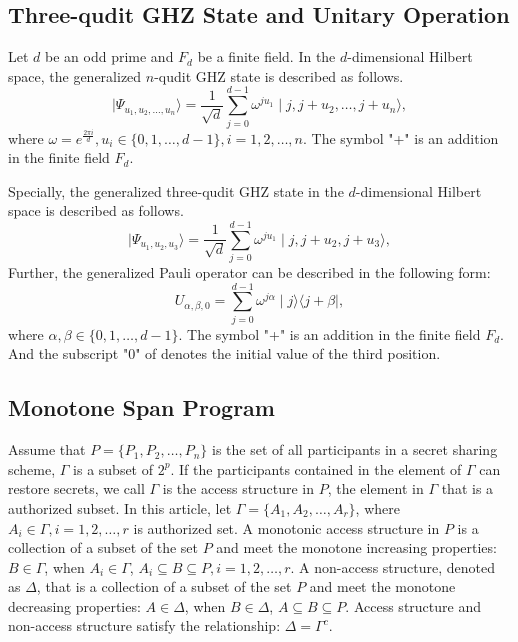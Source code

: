 \documentclass[pdflatex,sn-mathphys]{sn-jnl}%
\theoremstyle{thmstyleone}%
\theoremstyle{thmstyletwo}%
\theoremstyle{thmstylethree}%
\begin{document}
\subsection{Three-qudit GHZ State and Unitary Operation}\label{subsec2}

Let $d$ be an odd prime and $F_d$ be a finite field. In the $d$-dimensional Hilbert space, the generalized $n$-qudit GHZ state is described as follows.
\begin{equation}
\mid\varPsi_{{u_1},{u_2},\dots,{u_n}}\rangle=\frac{1}{\sqrt{d}}\sum_{j=0}^{d-1} \omega^{j{u_1}}\mid{j,j+{u_2,\dots,j+u_n}}\rangle,\label{eq1}
\end{equation}
where $\omega=e^\frac{2\pi i}{d},u_i\in\lbrace0,1,\dots,d-1\rbrace, i=1,2,\dots,n$. The symbol "+" is an addition in the finite field $F_d$.

Specially, the generalized three-qudit GHZ state in the $d$-dimensional Hilbert space is described as follows.
\begin{equation}
\mid\varPsi_{{u_1},{u_2},{u_3}}\rangle=\frac{1}{\sqrt{d}}\sum_{j=0}^{d-1} \omega^{j{u_1}}\mid{j,j+{u_2,j+u_3}}\rangle,\label{eq2}
\end{equation}
Further, the generalized Pauli operator can be described in the following form:
\begin{equation}
U_{{\alpha},{\beta},{0}}=\sum_{j=0}^{d-1} \omega^{j{\alpha}}\mid{j}\rangle\langle{j+\beta}\mid,\label{eq3}
\end{equation}
where $\alpha,\beta\in\lbrace0,1,\dots,d-1\rbrace$. The symbol "+" is an addition in the finite field $F_d$. And the subscript "0" of denotes the initial value of the third position.

\subsection{Monotone Span Program}\label{subsec2}

Assume that $P=\lbrace{{P_1},{P_2},\dots,{P_n}}\rbrace$ is the set of all participants in a secret sharing scheme, $\varGamma$ is a subset of $2^p$.  If the participants contained in the element of $\varGamma$ can restore secrets, we call $\varGamma$ is the access structure in $P$,  the element in $\varGamma $ that is a authorized subset. In this article, let $\varGamma=\lbrace{A_1,A_2,\dots,A_r}\rbrace$, where $A_i\in \varGamma,i=1,2,\dots,r$ is authorized set.
A monotonic access structure in $P$ is a collection of a subset of the set $P$ and meet the monotone increasing properties: $B\in\varGamma$, when $A_i\in \varGamma $, $A_i\subseteq B\subseteq P, i=1,2,\dots,r $. A non-access structure, denoted as $\Delta $, that is a collection of a subset of the set $P$ and meet the monotone decreasing properties: $A\in\Delta$, when $B\in \Delta $, $A\subseteq B\subseteq P $. Access structure and non-access structure satisfy the relationship: $\Delta=\varGamma^c $.
\end{document}
